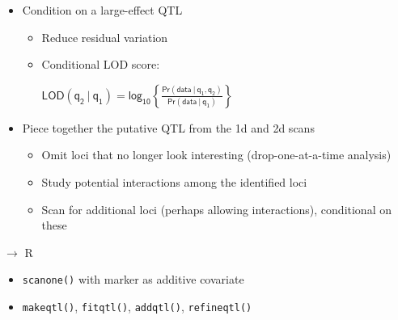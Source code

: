 \documentclass[12pt]{article}
\newcommand{\headsize}{\fontsize{35}{35} \selectfont}
\newcommand{\smallsize}{\fontsize{25}{30} \selectfont}
\newcommand{\smallestsize}{\fontsize{18}{22} \selectfont}
\newcommand{\lod}{\text{LOD}}
\begin{document}
\hfill
\begin{minipage}{10in}
\begin{itemize}
\itemsep36pt
\item Condition on a large-effect QTL


{\color{myblue} \smallestsize
\begin{itemize}
\item Reduce residual variation
\item Conditional LOD score:

\vspace{1cm}

\hspace{1in} $ \displaystyle{\mathsf{\lod(q_2 \ | \ q_1) = \text{log}_{10}
    \left\{\frac{\text{Pr}(\text{data} \ | \ q_1, q_2)}{
    \text{Pr}(\text{data} \ | \ q_1)}\right\} }}$
\end{itemize} }

\item Piece together the putative QTL from the 1d and 2d scans

{\color{myblue} \smallestsize
\begin{itemize}
\item Omit loci that no longer look interesting (drop-one-at-a-time analysis)
\item Study potential interactions among the identified loci
\item Scan for additional loci (perhaps allowing interactions), conditional on these
\end{itemize} }

\end{itemize}
\end{minipage}



\newpage

\headsize \color{myyellow}
$\boldsymbol{\rightarrow}$ R

\vspace{3cm}

\color{mywhite} \smallsize

\hfill \begin{minipage}[t]{9.5in}
\begin{itemize}
\itemsep24pt
\item \verb|scanone()| with marker as additive covariate
\item \verb|makeqtl()|, \verb|fitqtl()|, \verb|addqtl()|, \verb|refineqtl()|
\end{itemize} \end{minipage}
\end{document}

